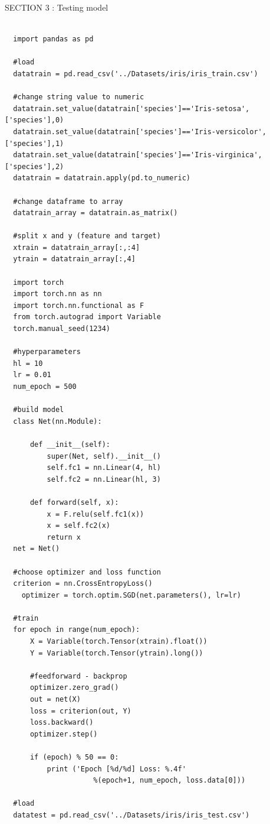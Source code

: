 \documentclass{article}
\begin{document}
\begin{CJK}{UTF8}{}
  SECTION 3 : Testing model\newline


\begin{verbatim}
               
  import pandas as pd

  #load
  datatrain = pd.read_csv('../Datasets/iris/iris_train.csv')

  #change string value to numeric
  datatrain.set_value(datatrain['species']=='Iris-setosa',['species'],0)
  datatrain.set_value(datatrain['species']=='Iris-versicolor',['species'],1)
  datatrain.set_value(datatrain['species']=='Iris-virginica',['species'],2)
  datatrain = datatrain.apply(pd.to_numeric)

  #change dataframe to array
  datatrain_array = datatrain.as_matrix()

  #split x and y (feature and target)
  xtrain = datatrain_array[:,:4]
  ytrain = datatrain_array[:,4]

  import torch
  import torch.nn as nn
  import torch.nn.functional as F
  from torch.autograd import Variable
  torch.manual_seed(1234)

  #hyperparameters
  hl = 10
  lr = 0.01
  num_epoch = 500

  #build model
  class Net(nn.Module):

      def __init__(self):
          super(Net, self).__init__()
          self.fc1 = nn.Linear(4, hl)
          self.fc2 = nn.Linear(hl, 3)

      def forward(self, x):
          x = F.relu(self.fc1(x))
          x = self.fc2(x)
          return x
  net = Net()

  #choose optimizer and loss function
  criterion = nn.CrossEntropyLoss()
    optimizer = torch.optim.SGD(net.parameters(), lr=lr)

  #train
  for epoch in range(num_epoch):
      X = Variable(torch.Tensor(xtrain).float())
      Y = Variable(torch.Tensor(ytrain).long())

      #feedforward - backprop
      optimizer.zero_grad()
      out = net(X)
      loss = criterion(out, Y)
      loss.backward()
      optimizer.step()

      if (epoch) % 50 == 0:
          print ('Epoch [%d/%d] Loss: %.4f' 
                     %(epoch+1, num_epoch, loss.data[0]))

  #load
  datatest = pd.read_csv('../Datasets/iris/iris_test.csv')


\end{verbatim}
\end{CJK}
\end{document}
